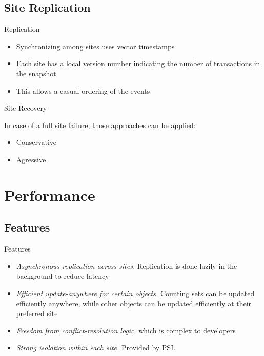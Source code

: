 \documentclass{beamer}
\begin{document}
	\subsection{Site Replication}
	 	
	 	
		\begin{frame}{Replication}
				
		\begin{itemize}
		
		\item Synchronizing among sites uses vector timestamps
		\item Each site has a local version number indicating the number of transactions in the snapshot
		\item This allows a casual ordering of the events
		
		\end{itemize}
		
		\end{frame}	 	
		
		\begin{frame}{Site Recovery}
		
		In case of a full site failure, those approaches can be applied:
		\begin{itemize}
		\item Conservative
		\item Agressive
		\end{itemize}		
		
		\end{frame}	 	
 	
 	
\section{Performance}

	\subsection{Features}
	
	\begin{frame}{Features}
	
		\begin{itemize}
		\item \textit{Asynchronous replication across sites.} Replication is done lazily in the background to reduce latency
		\item \textit{Efficient update-anywhere for certain objects.} Counting sets can be updated efficiently anywhere, while other objects can be updated efficiently at their preferred site
		\item \textit{Freedom from conflict-resolution logic}. which is complex to developers
		\item \textit{Strong isolation within each site.} Provided by PSI.
		\end{itemize}
	\end{frame}
\end{document}
